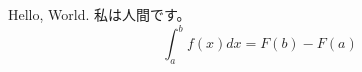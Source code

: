 \documentclass{jsarticle}
\begin{document}
Hello, World.
私は人間です。
\begin{equation}
\int_{a}^{b}f(x)dx=F(b) - F(a)
\end{equation}
\end{document}
